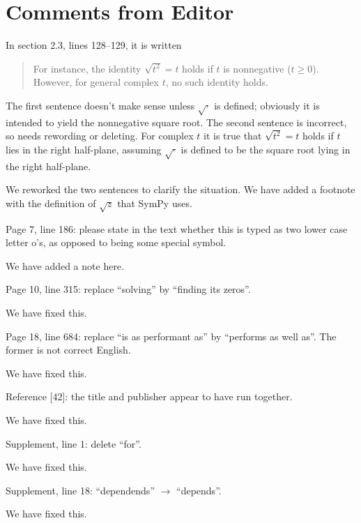 \documentclass[answers,12pt]{exam}
\begin{document}


\section{Comments from Editor}

\begin{questions}
\question  In section 2.3, lines 128--129, it is written
\begin{quote}
For instance, the identity $\sqrt{t^2} = t$ holds if $t$ is nonnegative ($t \geq
0$). However, for general complex $t$, no such identity holds.
\end{quote}
The first sentence doesn't make sense unless $\sqrt{\cdot}$ is defined;
obviously it is intended to yield the nonnegative square root. The second
sentence is incorrect, so needs rewording or deleting. For complex $t$ it is
true that $\sqrt{t^2} = t$ holds if $t$ lies in the right half-plane, assuming
$\sqrt{\cdot}$ is defined to be the square root lying in the right half-plane.
\begin{solution}
We reworked the two sentences to clarify the situation. We have added a
footnote with the definition of $\sqrt z$ that SymPy uses.
\end{solution}

\question Page 7, line 186: please state in the text whether this is typed as two lower case letter o's, as opposed to being some special symbol.
\begin{solution}
We have added a note here.
\end{solution}

\question Page 10, line 315: replace ``solving'' by ``finding its zeros''.
\begin{solution}
We have fixed this.
\end{solution}

\question Page 18, line 684: replace ``is as performant as'' by ``performs as well as''. The former is not correct English.
\begin{solution}
We have fixed this.
\end{solution}

\question Reference [42]: the title and publisher appear to have run together.
\begin{solution}
We have fixed this.
\end{solution}

\question Supplement, line 1: delete ``for''.
\begin{solution}
We have fixed this.
\end{solution}

\question Supplement, line 18: ``dependends'' $\rightarrow$ ``depends''.
\begin{solution}
We have fixed this.
\end{solution}

\end{questions}
\end{document}
